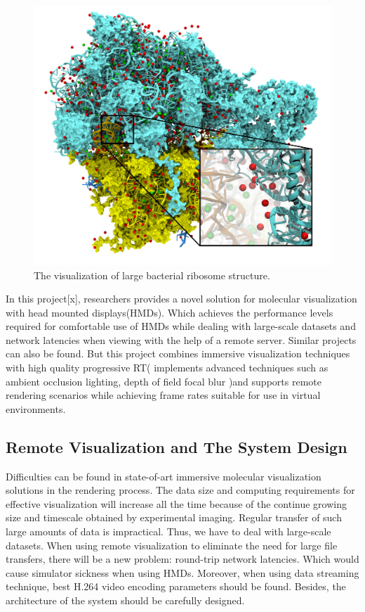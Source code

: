 \documentclass[10pt,twocolumn,letterpaper]{article}
\begin{document}
\begin{figure}[h]
\begin{center}
   \includegraphics[width=1.0\linewidth]{complex-structure.jpg}
\end{center}
   \caption{The visualization of large bacterial ribosome structure.}
\label{fig:long}
\label{fig:onecol}
\end{figure}

In this project[x], researchers provides a novel solution for molecular visualization with head mounted displays(HMDs). Which achieves the performance levels required for comfortable use of HMDs while dealing with large-scale datasets and network latencies when viewing with the help of a remote server. Similar projects can also be found. But this project combines immersive visualization techniques with high quality progressive RT( implements advanced techniques such as ambient occlusion lighting, depth of field focal blur )and supports remote rendering scenarios while achieving frame rates suitable for use in virtual environments. 

\subsection{Remote Visualization and The System Design}

Difficulties can be found in state-of-art immersive molecular visualization solutions in the rendering process. The data size and computing requirements for effective visualization will increase all the time because of the continue growing size and timescale obtained by experimental imaging. Regular transfer of such large amounts of data is impractical. Thus, we have to deal with large-scale datasets. When using remote visualization to eliminate the need for large file transfers, there will be a new problem: round-trip network latencies. Which would cause simulator sickness when using HMDs. Moreover, when using data streaming technique, best H.264 video encoding parameters should be found. Besides, the architecture of the system should be carefully designed.
\end{document}
